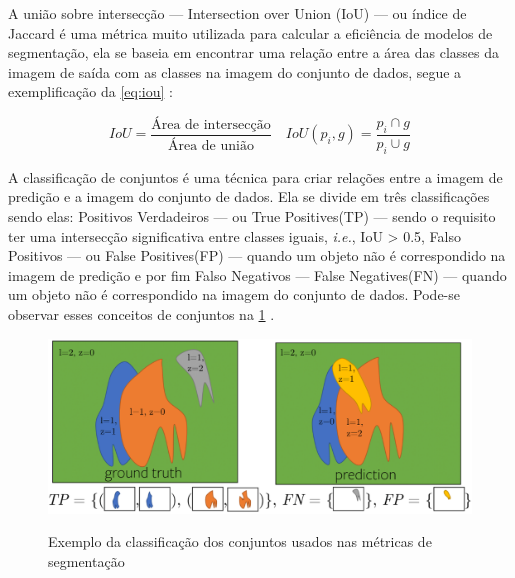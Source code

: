 
A união sobre intersecção — Intersection over Union (IoU) — ou índice de Jaccard é uma métrica muito utilizada para calcular a eficiência de modelos de segmentação, ela se baseia em encontrar uma relação entre a área das classes da imagem de saída com as classes na imagem do conjunto de dados, segue a exemplificação da \cref{eq:iou} \space\cite{dp_semantic_segmantation, lapix, kirillov2019panoptic}:

\begin{equation}
	\label{eq:iou}	
	IoU = \frac{\text{Área de intersecção}}{\text{Área de união}} \quad IoU(p_i, g) = \frac{p_i \cap g}{ p_i \cup g}
\end{equation}



A classificação de conjuntos é uma técnica para criar relações entre a imagem de predição e a imagem do conjunto de dados. Ela se divide em três classificações sendo elas: Positivos Verdadeiros — ou True Positives(TP) — sendo o requisito ter uma intersecção significativa entre classes iguais, \emph{i.e.}, IoU > 0.5, Falso Positivos — ou False Positives(FP) — quando um objeto não é correspondido na imagem de predição e por fim Falso Negativos — False Negatives(FN) — quando um objeto não é correspondido na imagem do conjunto de dados. Pode-se observar esses conceitos de conjuntos na \cref{fig:conjuntos} \space\cite{kirillov2019panoptic}.
\begin{figure}[ht]
	\caption{Exemplo da classificação dos conjuntos usados nas métricas de segmentação}
	\centering %
	\includegraphics[width=15cm]{figures/pan_metric.png} %
	\label{fig:conjuntos}
\end{figure}


